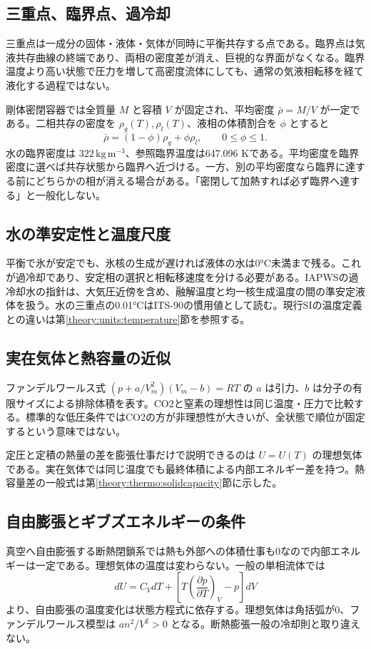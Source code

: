 \subsection{三重点、臨界点、過冷却}
\label{theory:phase_sep:critical}
三重点は一成分の固体・液体・気体が同時に平衡共存する点である。臨界点は気液共存曲線の終端であり、両相の密度差が消え、巨視的な界面がなくなる。臨界温度より高い状態で圧力を増して高密度流体にしても、通常の気液相転移を経て液化する過程ではない。

\label{theory:phase_sep:isochore}
剛体密閉容器では全質量 \(M\) と容積 \(V\) が固定され、平均密度 \(\bar\rho=M/V\) が一定である。二相共存の密度を \(\rho_g(T),\rho_l(T)\)、液相の体積割合を \(\phi\) とすると
\[
 \bar\rho=(1-\phi)\rho_g+\phi\rho_l,\qquad0\le\phi\le1.
\]
水の臨界密度は \(322\,\mathrm{kg\,m^{-3}}\)、参照臨界温度は647.096 Kである\parencite{iapws95_2018}。平均密度を臨界密度に選べば共存状態から臨界へ近づける。一方、別の平均密度なら臨界に達する前にどちらかの相が消える場合がある。「密閉して加熱すれば必ず臨界へ達する」と一般化しない。

\subsection{水の準安定性と温度尺度}
\label{theory:phase_sep:metastable}
\label{theory:phase_sep:water}
平衡で氷が安定でも、氷核の生成が遅ければ液体の水は0°C未満まで残る。これが過冷却であり、安定相の選択と相転移速度を分ける必要がある。IAPWSの過冷却水の指針は、大気圧近傍を含め、融解温度と均一核生成温度の間の準安定液体を扱う\parencite{iapws_supercooled2015}。水の三重点の0.01°CはITS-90の慣用値として読む。現行SIの温度定義との違いは第\ref{theory:units:temperature}節を参照する。

\subsection{実在気体と熱容量の近似}
\label{theory:phase_sep:realgas}
\label{theory:phase_sep:capacity}
ファンデルワールス式 \((p+a/V_m^2)(V_m-b)=RT\) の \(a\) は引力、\(b\) は分子の有限サイズによる排除体積を表す。CO2と窒素の理想性は同じ温度・圧力で比較する。標準的な低圧条件ではCO2の方が非理想性が大きいが、全状態で順位が固定するという意味ではない。

定圧と定積の熱量の差を膨張仕事だけで説明できるのは \(U=U(T)\) の理想気体である。実在気体では同じ温度でも最終体積による内部エネルギー差を持つ。熱容量差の一般式は第\ref{theory:thermo:solidcapacity}節に示した。

\subsection{自由膨張とギブズエネルギーの条件}
\label{theory:phase_sep:free}
\label{theory:phase_sep:gibbs}
真空へ自由膨張する断熱閉鎖系では熱も外部への体積仕事も0なので内部エネルギーは一定である。理想気体の温度は変わらない。一般の単相流体では
\[
 dU=C_VdT+\left[T\left(\frac{\partial p}{\partial T}\right)_V-p\right]dV
\]
より、自由膨張の温度変化は状態方程式に依存する。理想気体は角括弧が0、ファンデルワールス模型は \(a n^2/V^2>0\) となる。断熱膨張一般の冷却則と取り違えない。


